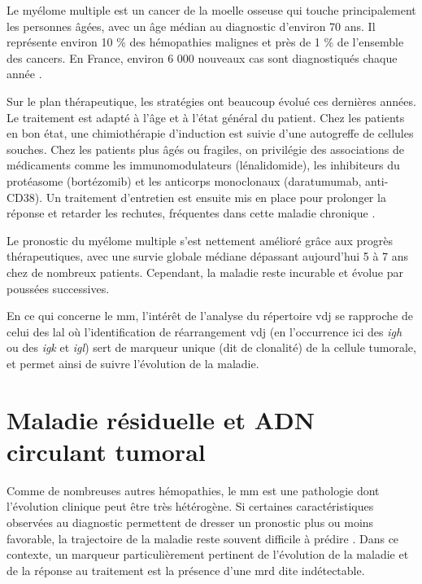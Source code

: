 Le myélome multiple est un cancer de la moelle osseuse qui touche principalement 
les personnes âgées, avec un âge médian au diagnostic d'environ 70 ans. 
Il représente environ 10 \% des hémopathies malignes et près de 1 \% de l'ensemble des cancers. 
En France, environ 6 000 nouveaux cas sont diagnostiqués chaque année 
\cite{spfSurviePersonnesAtteintes}.

Sur le plan thérapeutique, les stratégies ont beaucoup évolué ces dernières années. 
Le traitement est adapté à l'âge et à l'état général du patient. 
Chez les patients en bon état, une chimiothérapie d'induction est suivie d'une autogreffe 
de cellules souches. Chez les patients plus âgés ou fragiles, on privilégie des associations 
de médicaments comme les immunomodulateurs (lénalidomide), les inhibiteurs du protéasome 
(bortézomib) et les anticorps monoclonaux (daratumumab, anti-CD38). 
Un traitement d'entretien est ensuite mis en place pour prolonger la réponse et retarder 
les rechutes, fréquentes dans cette maladie chronique 
\cite{cowanDiagnosisManagementMultiple2022a}.

Le pronostic du myélome multiple s'est nettement amélioré grâce aux progrès thérapeutiques, 
avec une survie globale médiane dépassant aujourd'hui 5 à 7 ans chez de nombreux patients. 
Cependant, la maladie reste incurable et évolue par poussées successives.

En ce qui concerne le \gls{mm}, l'intérêt de l'analyse du répertoire \gls{vdj}
se rapproche de celui des \gls{lal} où l'identification de réarrangement
\gls{vdj} (en l'occurrence ici des \textit{\gls{igh}} ou des \textit{\gls{igk}}
et \textit{\gls{igl}}) sert de marqueur unique (dit de clonalité) de la cellule
tumorale, et permet ainsi de suivre l'évolution de la maladie.

\section{Maladie résiduelle et ADN circulant tumoral}

Comme de nombreuses autres hémopathies, le \gls{mm} est une pathologie dont
l'évolution clinique peut être très hétérogène. Si certaines caractéristiques
observées au diagnostic permettent de dresser un pronostic plus ou moins
favorable, la trajectoire de la maladie reste souvent difficile à prédire
\cite{hanamuraMultipleMyelomaHighrisk2022}. Dans ce contexte, un marqueur
particulièrement pertinent de l'évolution de la maladie et de la réponse au
traitement est la présence d'une \gls{mrd} dite indétectable.

